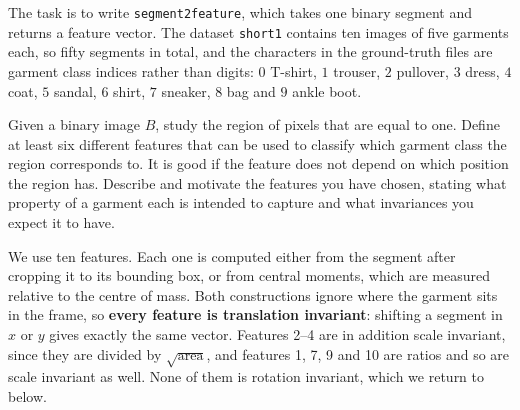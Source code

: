 \documentclass[11pt]{article}
\begin{document}
The task is to write \texttt{segment2feature}, which takes one binary segment
and returns a feature vector. The dataset \texttt{short1} contains ten images
of five garments each, so fifty segments in total, and the characters in the
ground-truth files are garment class indices rather than digits: $0$ T-shirt,
$1$ trouser, $2$ pullover, $3$ dress, $4$ coat, $5$ sandal, $6$ shirt,
$7$ sneaker, $8$ bag and $9$ ankle boot.

\begin{question}
Given a binary image $B$, study the region of pixels that are equal to one.
Define at least six different features that can be used to classify which
garment class the region corresponds to. It is good if the feature does not
depend on which position the region has. Describe and motivate the features
you have chosen, stating what property of a garment each is intended to
capture and what invariances you expect it to have.
\end{question}

We use ten features. Each one is computed either from the segment after
cropping it to its bounding box, or from central moments, which are measured
relative to the centre of mass. Both constructions ignore where the garment
sits in the frame, so \textbf{every feature is translation invariant}: shifting
a segment in $x$ or $y$ gives exactly the same vector. Features 2--4 are in
addition scale invariant, since they are divided by $\sqrt{\text{area}}$, and
features 1, 7, 9 and 10 are ratios and so are scale invariant as well. None of
them is rotation invariant, which we return to below.
\end{document}
